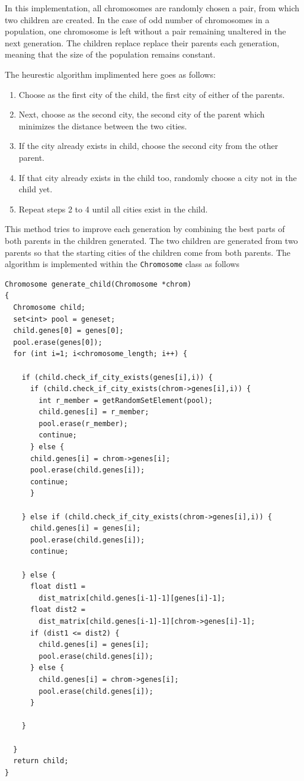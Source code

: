 \documentclass[12pt]{article}
\begin{document}
In this implementation, all chromosomes are randomly chosen a pair, from which two children are
created. In the case of odd number of chromosomes in a population, one chromosome is left without
a pair remaining unaltered in the next generation. The children replace replace their parents
each generation, meaning that the size of the population remains constant.

The heurestic algorithm implimented here goes as follows:

\begin{enumerate}
\item Choose as the first city of the child, the first city of either of the parents.
\item Next, choose as the second city, the second city of the parent which minimizes the
  distance between the two cities.
\item If the city already exists in child, choose the second city from the other parent.
\item If that city already exists in the child too, randomly choose a city not in the child yet.
\item Repeat steps 2 to 4 until all cities exist in the child.
\end{enumerate}

This method tries to improve each generation by combining the best parts of both parents in the
children generated. The two children are generated from two parents so that the starting cities of
the children come from both parents. The algorithm is implemented within the \lstinline!Chromosome!
class as follows

\newpage

\begin{lstlisting}
Chromosome generate_child(Chromosome *chrom)
{
  Chromosome child;
  set<int> pool = geneset;
  child.genes[0] = genes[0];
  pool.erase(genes[0]);
  for (int i=1; i<chromosome_length; i++) {
    
    if (child.check_if_city_exists(genes[i],i)) {
      if (child.check_if_city_exists(chrom->genes[i],i)) {
        int r_member = getRandomSetElement(pool);
        child.genes[i] = r_member;
        pool.erase(r_member);
        continue;
      } else {
	  child.genes[i] = chrom->genes[i];
	  pool.erase(child.genes[i]);
	  continue;
      }
	
    } else if (child.check_if_city_exists(chrom->genes[i],i)) {
      child.genes[i] = genes[i];
      pool.erase(child.genes[i]);
      continue;
	
    } else {
      float dist1 =
        dist_matrix[child.genes[i-1]-1][genes[i]-1];
      float dist2 =
        dist_matrix[child.genes[i-1]-1][chrom->genes[i]-1];
      if (dist1 <= dist2) {
        child.genes[i] = genes[i];
        pool.erase(child.genes[i]);
      } else {
        child.genes[i] = chrom->genes[i];
        pool.erase(child.genes[i]);
      }
      
    }
      
  }
  return child;
}
\end{lstlisting}
\end{document}
